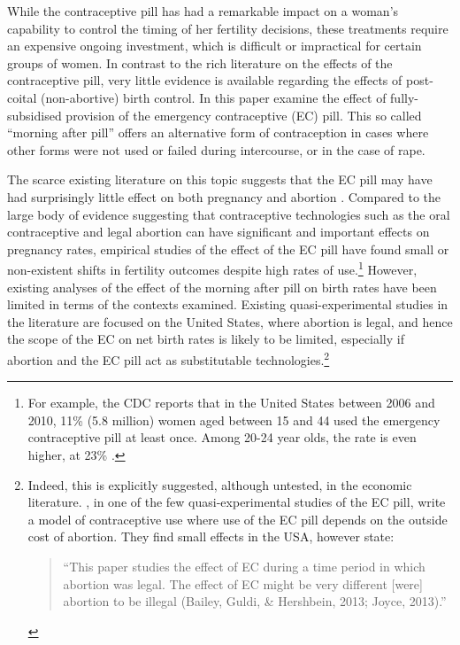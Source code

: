 While the contraceptive pill has had a remarkable impact on a woman's capability
to control the timing of her fertility decisions, these treatments require an
expensive ongoing investment, which is difficult or impractical for certain 
groups of women.  In contrast to the rich literature on the effects of the 
contraceptive pill, very little evidence is available regarding the effects of 
post-coital (non-abortive) birth control.  In this paper \person examine the 
effect of fully-subsidised provision of the emergency contraceptive (EC) pill.  
This so called ``morning after pill'' offers an alternative form of 
contraception in cases where other forms were not used or failed during 
intercourse, or in the case of rape.

The scarce existing literature on this topic suggests that the EC pill may have 
had surprisingly little effect on both pregnancy and abortion 
\citep{Grossetal2014,Durrance2013}. Compared to the large body of evidence 
suggesting that contraceptive technologies such as the oral contraceptive and 
legal abortion can have significant and important effects on pregnancy rates, 
empirical studies of the effect of the EC pill have found small or non-existent 
shifts in fertility outcomes despite high rates of use.\footnote{For example, 
the CDC reports that in the United States between 2006 and 2010, 11\% (5.8 
million) women aged between 15 and 44 used the emergency contraceptive pill at 
least once.  Among 20-24 year olds, the rate is even higher, at 23\% 
\citep{Danielsetal2013}.}  However, existing analyses of the effect of the 
morning after pill on birth rates have been limited in terms of the contexts 
examined.  Existing quasi-experimental studies in the literature are focused on 
the United States, where abortion is legal, and hence the scope of the EC on 
net birth rates is likely to be limited, especially if abortion and the EC pill
act as substitutable technologies.\footnote{Indeed, this is explicitly 
suggested, although untested, in the economic literature. \citet{Grossetal2014}, 
in one of the few quasi-experimental studies of the EC pill, write a model of 
contraceptive use where use of the EC pill depends on the outside cost of 
abortion. They find small effects in the USA, however state:
     \begin{quote}
     ``This paper studies the effect of EC during a time period in which
     abortion was legal. The effect of EC might be very different [were]
     abortion to be illegal (Bailey, Guldi, \& Hershbein, 2013; Joyce,
     2013).''
     \end{quote}}

